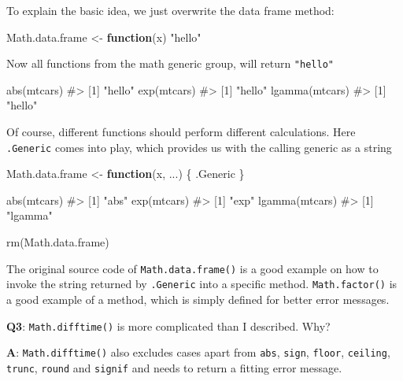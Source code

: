 \documentclass[
]{krantz}
\makeatletter
\newenvironment{Shaded}{\begin{snugshade}}{\end{snugshade}}
\newcommand{\CommentTok}[1]{\textcolor[rgb]{0.56,0.35,0.01}{\textit{#1}}}
\newcommand{\ControlFlowTok}[1]{\textcolor[rgb]{0.13,0.29,0.53}{\textbf{#1}}}
\newcommand{\KeywordTok}[1]{\textcolor[rgb]{0.13,0.29,0.53}{\textbf{#1}}}
\newcommand{\NormalTok}[1]{#1}
\newcommand{\StringTok}[1]{\textcolor[rgb]{0.31,0.60,0.02}{#1}}
\newenvironment{kframe}{%
\medskip{}
\setlength{\fboxsep}{.8em}
 \def\at@end@of@kframe{}%
 \ifinner\ifhmode%
  \def\at@end@of@kframe{\end{minipage}}%
  \begin{minipage}{\columnwidth}%
 \fi\fi%
 \def\FrameCommand##1{\hskip\@totalleftmargin \hskip-\fboxsep
 \colorbox{shadecolor}{##1}\hskip-\fboxsep
     \hskip-\linewidth \hskip-\@totalleftmargin \hskip\columnwidth}%
 \MakeFramed {\advance\hsize-\width
   \@totalleftmargin\z@ \linewidth\hsize
   \@setminipage}}%
 {\par\unskip\endMakeFramed%
 \at@end@of@kframe}
\renewenvironment{Shaded}{\begin{kframe}}{\end{kframe}}
\renewcommand{\KeywordTok} [1]{\textcolor[rgb]{0.00,0.44,0.13}{{#1}}}
\renewcommand{\StringTok}  [1]{\textcolor[rgb]{0.25,0.44,0.63}{{#1}}}
\renewcommand{\CommentTok} [1]{\textcolor[rgb]{0.38,0.63,0.69}{{#1}}}
\renewcommand{\NormalTok}  [1]{{#1}}
\makeatother
\begin{document}
To explain the basic idea, we just overwrite the data frame method:

\begin{Shaded}
\begin{Highlighting}[]
\NormalTok{Math.data.frame <-}\StringTok{ }\ControlFlowTok{function}\NormalTok{(x) }\StringTok{"hello"}
\end{Highlighting}
\end{Shaded}

Now all functions from the math generic group, will return \texttt{"hello"}

\begin{Shaded}
\begin{Highlighting}[]
\KeywordTok{abs}\NormalTok{(mtcars)}
\CommentTok{#> [1] "hello"}
\KeywordTok{exp}\NormalTok{(mtcars)}
\CommentTok{#> [1] "hello"}
\KeywordTok{lgamma}\NormalTok{(mtcars)}
\CommentTok{#> [1] "hello"}
\end{Highlighting}
\end{Shaded}

Of course, different functions should perform different calculations. Here \texttt{.Generic} comes into play, which provides us with the calling generic as a string

\begin{Shaded}
\begin{Highlighting}[]
\NormalTok{Math.data.frame <-}\StringTok{ }\ControlFlowTok{function}\NormalTok{(x, ...) \{}
\NormalTok{  .Generic}
\NormalTok{\}}

\KeywordTok{abs}\NormalTok{(mtcars)}
\CommentTok{#> [1] "abs"}
\KeywordTok{exp}\NormalTok{(mtcars)}
\CommentTok{#> [1] "exp"}
\KeywordTok{lgamma}\NormalTok{(mtcars)}
\CommentTok{#> [1] "lgamma"}

\KeywordTok{rm}\NormalTok{(Math.data.frame)}
\end{Highlighting}
\end{Shaded}

The original source code of \texttt{Math.data.frame()} is a good example on how to invoke the string returned by \texttt{.Generic} into a specific method. \texttt{Math.factor()} is a good example of a method, which is simply defined for better error messages.

\textbf{{Q3}}: \texttt{Math.difftime()} is more complicated than I described. Why?

\textbf{{A}}: \texttt{Math.difftime()} also excludes cases apart from \texttt{abs}, \texttt{sign}, \texttt{floor}, \texttt{ceiling}, \texttt{trunc}, \texttt{round} and \texttt{signif} and needs to return a fitting error message.
\end{document}
